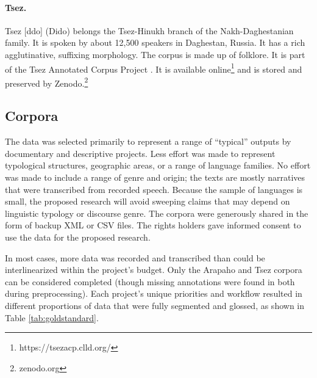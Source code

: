 \paragraph{Tsez.}
Tsez [ddo] (Dido) belongs the Tsez-Hinukh branch of the Nakh-Daghestanian family. It is spoken by about 12,500 speakers in Daghestan, Russia. It has a rich agglutinative, suffixing morphology. The corpus is made up of folklore. It is part of the Tsez Annotated Corpus Project \citep{abdulaev-tsezcorpus-2010}. It is available online\footnote{https://tsezacp.clld.org/} and is stored and preserved by Zenodo.\footnote{zenodo.org}

\subsection{Corpora}

The data was selected primarily to represent a range of “typical” outputs by documentary and descriptive projects. Less effort was made to represent typological structures, geographic areas, or a range of language families. No effort was made to include a range of genre and origin; the texts are mostly narratives that were transcribed from recorded speech. Because the sample of languages is small, the proposed research will avoid sweeping claims that may depend on linguistic typology or discourse genre. 
The corpora were generously shared in the form of backup XML or CSV files. The rights holders gave informed consent to use the data for the proposed research. 

In most cases, more data was recorded and transcribed than could be interlinearized within the project's budget. Only the Arapaho and Tsez corpora can be considered completed (though missing annotations were found in both during preprocessing). Each project's unique priorities and workflow resulted in different proportions of data that were fully segmented and glossed, as shown in Table \ref{tab:goldstandard}.

